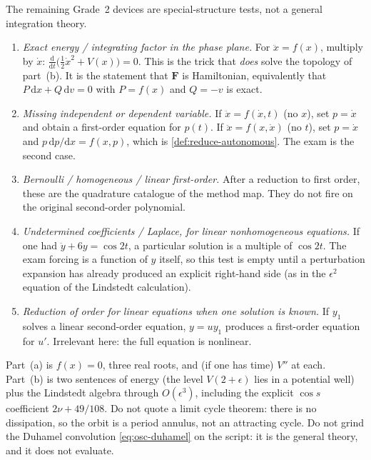 \documentclass[11pt,a4paper]{article}
\begin{document}
\begin{example}
\label{ex:ode-tricks}
The remaining Grade~2 devices are special-structure tests, not a general integration theory.
\begin{enumerate}[label=\textup{(\roman*)}]
    \item \emph{Exact energy / integrating factor in the phase plane.} For \(\ddot x=f(x)\), multiply by \(\dot x\): \(\frac{\mathrm{d}}{\mathrm{d}t}\bigl(\tfrac12\dot x^{2}+V(x)\bigr)=0\). This is the trick that \emph{does} solve the topology of part~(b). It is the statement that \(\mathbf{F}\) is Hamiltonian, equivalently that \(P\,\mathrm{d}x+Q\,\mathrm{d}v=0\) with \(P=f(x)\) and \(Q=-v\) is exact.
    \item \emph{Missing independent or dependent variable.} If \(\ddot x=f(\dot x,t)\) (no \(x\)), set \(p=\dot x\) and obtain a first-order equation for \(p(t)\). If \(\ddot x=f(x,\dot x)\) (no \(t\)), set \(p=\dot x\) and \(p\,\mathrm{d}p/\mathrm{d}x=f(x,p)\), which is \cref{def:reduce-autonomous}. The exam is the second case.
    \item \emph{Bernoulli / homogeneous / linear first-order.} After a reduction to first order, these are the quadrature catalogue of the method map. They do not fire on the original second-order polynomial.
    \item \emph{Undetermined coefficients / Laplace, for linear nonhomogeneous equations.} If one had \(\ddot y+6y=\cos 2t\), a particular solution is a multiple of \(\cos 2t\). The exam forcing is a function of \(y\) itself, so this test is empty until a perturbation expansion has already produced an explicit right-hand side (as in the \(\epsilon^{2}\) equation of the Lindstedt calculation).
    \item \emph{Reduction of order for linear equations when one solution is known.} If \(y_1\) solves a linear second-order equation, \(y=u y_1\) produces a first-order equation for \(u'\). Irrelevant here: the full equation is nonlinear.
\end{enumerate}
\end{example}


\begin{examnote}
\label{exnote:p6}
Part~(a) is \(f(x)=0\), three real roots, and (if one has time) \(V''\) at each. Part~(b) is two sentences of energy (the level \(V(2+\epsilon)\) lies in a potential well) plus the Lindstedt algebra through \(O(\epsilon^{3})\), including the explicit \(\cos s\) coefficient \(2\nu+49/108\). Do not quote a limit cycle theorem: there is no dissipation, so the orbit is a period annulus, not an attracting cycle. Do not grind the Duhamel convolution \eqref{eq:osc-duhamel} on the script: it is the general theory, and it does not evaluate.
\end{examnote}
\end{document}
